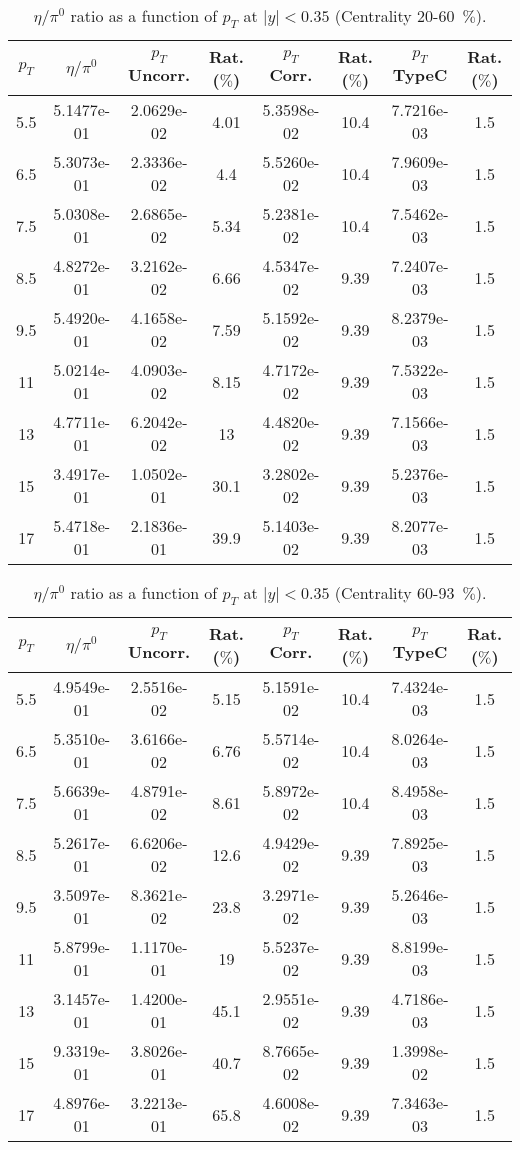             
\begin{table}[!htb]
\centering
\begin{tabular}{|c|c|c|c|c|c|c|c|}
\hline
$p_{T}$ & $\eta/\pi^{0}$ & $p_{T}$ Uncorr. & Rat. ($\%$)  
& $p_{T}$ Corr. & Rat. ($\%$) & $p_{T}$ TypeC & Rat. ($\%$) \\
\hline
5.5 & 5.1477e-01 & 2.0629e-02 & 4.01 & 5.3598e-02 & 10.4 & 7.7216e-03 & 1.5 \\ 
6.5 & 5.3073e-01 & 2.3336e-02 & 4.4 & 5.5260e-02 & 10.4 & 7.9609e-03 & 1.5 \\ 
7.5 & 5.0308e-01 & 2.6865e-02 & 5.34 & 5.2381e-02 & 10.4 & 7.5462e-03 & 1.5 \\ 
8.5 & 4.8272e-01 & 3.2162e-02 & 6.66 & 4.5347e-02 & 9.39 & 7.2407e-03 & 1.5 \\ 
9.5 & 5.4920e-01 & 4.1658e-02 & 7.59 & 5.1592e-02 & 9.39 & 8.2379e-03 & 1.5 \\ 
11 & 5.0214e-01 & 4.0903e-02 & 8.15 & 4.7172e-02 & 9.39 & 7.5322e-03 & 1.5 \\ 
13 & 4.7711e-01 & 6.2042e-02 & 13 & 4.4820e-02 & 9.39 & 7.1566e-03 & 1.5 \\ 
15 & 3.4917e-01 & 1.0502e-01 & 30.1 & 3.2802e-02 & 9.39 & 5.2376e-03 & 1.5 \\ 
17 & 5.4718e-01 & 2.1836e-01 & 39.9 & 5.1403e-02 & 9.39 & 8.2077e-03 & 1.5 \\ 
\hline
\end{tabular}
\caption{$\eta/\pi^{0}$ ratio as a function of $p_{T}$ at $|y|<0.35$ (Centrality 20-60~$\%$).}
\end{table}
            
            
\begin{table}[!htb]
\centering
\begin{tabular}{|c|c|c|c|c|c|c|c|}
\hline
$p_{T}$ & $\eta/\pi^{0}$ & $p_{T}$ Uncorr. & Rat. ($\%$)  
& $p_{T}$ Corr. & Rat. ($\%$) & $p_{T}$ TypeC & Rat. ($\%$) \\
\hline
5.5 & 4.9549e-01 & 2.5516e-02 & 5.15 & 5.1591e-02 & 10.4 & 7.4324e-03 & 1.5 \\ 
6.5 & 5.3510e-01 & 3.6166e-02 & 6.76 & 5.5714e-02 & 10.4 & 8.0264e-03 & 1.5 \\ 
7.5 & 5.6639e-01 & 4.8791e-02 & 8.61 & 5.8972e-02 & 10.4 & 8.4958e-03 & 1.5 \\ 
8.5 & 5.2617e-01 & 6.6206e-02 & 12.6 & 4.9429e-02 & 9.39 & 7.8925e-03 & 1.5 \\ 
9.5 & 3.5097e-01 & 8.3621e-02 & 23.8 & 3.2971e-02 & 9.39 & 5.2646e-03 & 1.5 \\ 
11 & 5.8799e-01 & 1.1170e-01 & 19 & 5.5237e-02 & 9.39 & 8.8199e-03 & 1.5 \\ 
13 & 3.1457e-01 & 1.4200e-01 & 45.1 & 2.9551e-02 & 9.39 & 4.7186e-03 & 1.5 \\ 
15 & 9.3319e-01 & 3.8026e-01 & 40.7 & 8.7665e-02 & 9.39 & 1.3998e-02 & 1.5 \\ 
17 & 4.8976e-01 & 3.2213e-01 & 65.8 & 4.6008e-02 & 9.39 & 7.3463e-03 & 1.5 \\ 
\hline
\end{tabular}
\caption{$\eta/\pi^{0}$ ratio as a function of $p_{T}$ at $|y|<0.35$ (Centrality 60-93~$\%$).}
\end{table}
            
